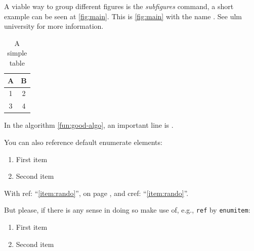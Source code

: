A viable way to group different figures is the \textit{subfigures} command, a short example can be seen at \cref{fig:main}.
This is \cref{fig:main} with the name .
See ulm university for more information.

\begin{table}
    \caption{A simple table}
    \begin{tabular}{cc}
        \toprule
        A & B \\
        \midrule
        1 & 2 \\
        3 & 4 \\
        \bottomrule
    \end{tabular}
    \label{tab:simple}
\end{table}

\begin{pseudo}[tbp]
    \caption{Algo Good}
    \label{fun:good-algo}
    \begin{algorithm}[H]
		\PreCode

        \StartCode
    \end{algorithm}
\end{pseudo}

In the  algorithm \cref{fun:good-algo}, an important line is .

You can also reference default enumerate elements:

\begin{enumerate}
    \item \label{item:rando}First item
    \item Second item
\end{enumerate}

With ref: \enquote{\ref{item:rando}}, on page \pageref{item:rando}, and cref: \enquote{\cref{item:rando}}.

But please, if there is any sense in doing so make use of, e.g., \texttt{ref} by \texttt{enumitem}:

\begin{enumerate}[ref={Penguin Element \arabic*}]
   \item \label{item:rando2}First item
   \item Second item
\end{enumerate}

